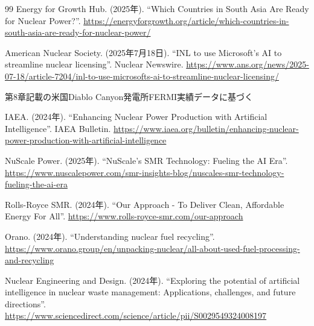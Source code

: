 \documentclass[10pt,a4paper]{jsarticle}
\begin{document}
\begin{thebibliography}{99}
Energy for Growth Hub. (2025年). ``Which Countries in South Asia Are Ready for Nuclear Power?''. \url{https://energyforgrowth.org/article/which-countries-in-south-asia-are-ready-for-nuclear-power/}

American Nuclear Society. (2025年7月18日). ``INL to use Microsoft's AI to streamline nuclear licensing''. Nuclear Newswire. \url{https://www.ans.org/news/2025-07-18/article-7204/inl-to-use-microsofts-ai-to-streamline-nuclear-licensing/}

第8章記載の米国Diablo Canyon発電所FERMI実績データに基づく

IAEA. (2024年). ``Enhancing Nuclear Power Production with Artificial Intelligence''. IAEA Bulletin. \url{https://www.iaea.org/bulletin/enhancing-nuclear-power-production-with-artificial-intelligence}

NuScale Power. (2025年). ``NuScale's SMR Technology: Fueling the AI Era''. \url{https://www.nuscalepower.com/smr-insights-blog/nuscales-smr-technology-fueling-the-ai-era}

Rolls-Royce SMR. (2024年). ``Our Approach - To Deliver Clean, Affordable Energy For All''. \url{https://www.rolls-royce-smr.com/our-approach}

Orano. (2024年). ``Understanding nuclear fuel recycling''. \url{https://www.orano.group/en/unpacking-nuclear/all-about-used-fuel-processing-and-recycling}

Nuclear Engineering and Design. (2024年). ``Exploring the potential of artificial intelligence in nuclear waste management: Applications, challenges, and future directions''. \url{https://www.sciencedirect.com/science/article/pii/S0029549324008197}

\end{thebibliography}
\end{document}
